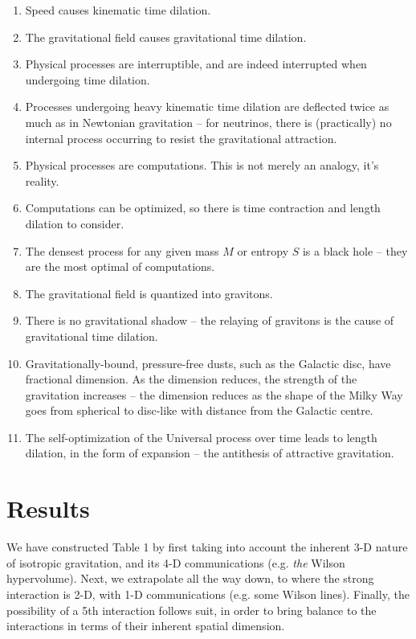 \documentclass[12pt]{article}
\begin{document}
\begin{enumerate}
\item Speed causes kinematic time dilation.
\item The gravitational field causes gravitational time dilation.
\item Physical processes are interruptible, and are indeed interrupted when undergoing time dilation.
\item Processes undergoing heavy kinematic time dilation are deflected twice as much as in Newtonian gravitation -- for neutrinos, there is (practically) no internal process occurring to resist the gravitational attraction.
\item Physical processes are computations.
This is not merely an analogy, it's reality.
\item Computations can be optimized, so there is time contraction and length dilation to consider.
\item The densest process for any given mass $M$ or entropy $S$ is a black hole -- they are the most optimal of computations.
\item The gravitational field is quantized into gravitons.
\item There is no gravitational shadow -- the relaying of gravitons is the cause of gravitational time dilation.
\item Gravitationally-bound, pressure-free dusts, such as the Galactic disc, have fractional dimension. As the dimension reduces, the strength of the gravitation increases -- the dimension reduces as the shape of the Milky Way goes from spherical to disc-like with distance from the Galactic centre.
\item The self-optimization of the Universal process over time leads to length dilation, in the form of expansion -- the antithesis of attractive gravitation.
\end{enumerate}







\section{Results}

We have constructed Table 1 by first taking into account the inherent 3-D nature of isotropic gravitation, and its 4-D communications (e.g. {\textit{the}} Wilson hypervolume).
Next, we extrapolate all the way down, to where the strong interaction is 2-D, with 1-D communications (e.g. some Wilson lines). 
Finally, the possibility of a 5th interaction follows suit, in order to bring balance to the interactions in terms of their inherent spatial dimension.
\end{document}
